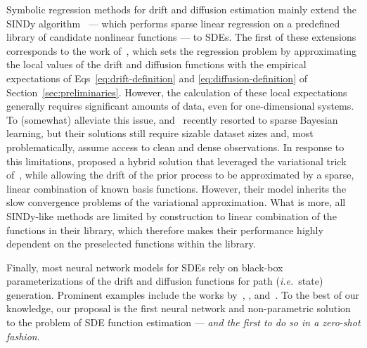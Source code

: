 %
Symbolic regression methods for drift and diffusion estimation mainly extend the SINDy algorithm~\cite{brunton2016discovering} --- which performs sparse linear regression on a predefined library of candidate nonlinear functions --- to SDEs.
%
The first of these extensions corresponds to the work of~\citet{boninsegna2018sparse}, which sets the regression problem by approximating the local values of the drift and diffusion functions with the empirical expectations of Eqs~\ref{eq:drift-definition} and \ref{eq:diffusion-definition} of Section~\ref{sec:preliminaries}.  
%
However, the calculation of these local expectations generally requires significant amounts of data, even for one-dimensional systems.
%
To (somewhat) alleviate this issue, \citet{huang2022sparse} and~\citet{WANG2022244} recently resorted to sparse Bayesian learning, but their solutions still require sizable dataset sizes and, most problematically, assume access to clean and dense observations.
%
In response to this limitations, \citet{course2023state} proposed a hybrid solution that leveraged the variational trick of~\citet{archambeau2007gaussian}, while allowing the drift of the prior process to be approximated by a sparse, linear combination of known basis functions.
%
However, their model inherits the slow convergence problems of the variational approximation. 
%
What is more, all SINDy-like methods are limited by construction to linear combination of the functions in their library, 
%
which therefore makes their performance highly dependent on the preselected functions within the library.

Finally, most neural network models for SDEs rely on black-box parameterizations of the drift and diffusion functions for path (\textit{i.e.}~state) generation. 
%
Prominent examples include the works by~\citet{li2020scalable}, \citet{kidger2021neural}, \citet{bilovs2023modeling} and~\citet{zeng2024latent}. 
%
To the best of our knowledge, our proposal is the first neural network and non-parametric solution to the problem of SDE function estimation --- \textit{and the first to do so in a zero-shot fashion}.

